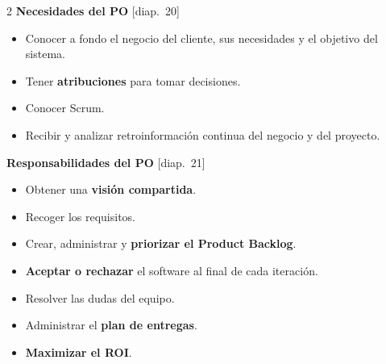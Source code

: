 \documentclass[11pt,a4paper,oneside,openany]{report}
\newcommand{\diap}[1]{\textcolor{mdaPrimary}{\small[diap.~#1]}}
\begin{document}
\begin{multicols}{2}\small
\textbf{Necesidades del PO} \diap{20}
\begin{itemize}[leftmargin=*,itemsep=1pt]
  \item Conocer a fondo el negocio del cliente, sus necesidades y el objetivo del sistema.
  \item Tener \textbf{atribuciones} para tomar decisiones.
  \item Conocer Scrum.
  \item Recibir y analizar retroinformación continua del negocio y del proyecto.
\end{itemize}
\columnbreak
\textbf{Responsabilidades del PO} \diap{21}
\begin{itemize}[leftmargin=*,itemsep=1pt]
  \item Obtener una \textbf{visión compartida}.
  \item Recoger los requisitos.
  \item Crear, administrar y \textbf{priorizar el Product Backlog}.
  \item \textbf{Aceptar o rechazar} el software al final de cada iteración.
  \item Resolver las dudas del equipo.
  \item Administrar el \textbf{plan de entregas}.
  \item \textbf{Maximizar el ROI}.
\end{itemize}
\end{multicols}
\end{document}
